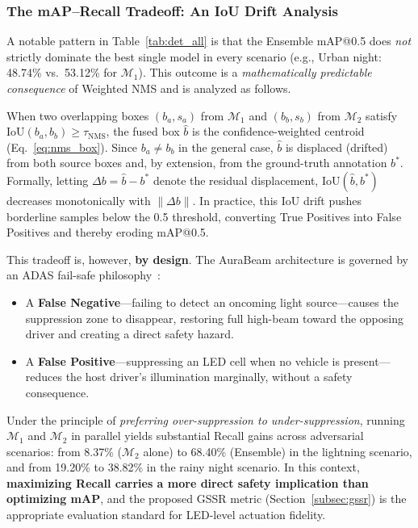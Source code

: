 \documentclass{jstarticle}
\theoremstyle{remark}
\begin{document}
\subsubsection*{The mAP--Recall Tradeoff: An IoU Drift Analysis}
\label{subsubsec:tradeoff}

A notable pattern in Table~\ref{tab:det_all} is that the Ensemble
mAP@0.5 does \emph{not} strictly dominate the best single model in
every scenario (e.g., Urban night: 48.74\% vs.\ 53.12\% for
$\mathcal{M}_1$). This outcome is a \emph{mathematically predictable
consequence} of Weighted NMS and is analyzed as follows.

When two overlapping boxes $(b_a, s_a)$ from $\mathcal{M}_1$ and
$(b_b, s_b)$ from $\mathcal{M}_2$ satisfy
$\mathrm{IoU}(b_a, b_b) \geq \tau_{\mathrm{NMS}}$, the fused box
$\hat{b}$ is the confidence-weighted centroid
(Eq.~\eqref{eq:nms_box}). Since $b_a \neq b_b$ in the general case,
$\hat{b}$ is displaced (drifted) from both source boxes and, by
extension, from the ground-truth annotation $b^*$. Formally, letting
$\Delta b = \hat{b} - b^*$ denote the residual displacement,
$\mathrm{IoU}(\hat{b}, b^*)$ decreases monotonically with
$\|\Delta b\|$. In practice, this IoU drift pushes borderline samples
below the 0.5 threshold, converting True Positives into False
Positives and thereby eroding mAP@0.5.

This tradeoff is, however, \textbf{by design}. The AuraBeam
architecture is governed by an ADAS fail-safe
philosophy~\cite{ISO26262_2018}:
\begin{itemize}[nosep]
  \item A \textbf{False Negative}---failing to detect an oncoming
    light source---causes the suppression zone to disappear, restoring
    full high-beam toward the opposing driver and creating a direct
    safety hazard.
  \item A \textbf{False Positive}---suppressing an LED cell when no
    vehicle is present---reduces the host driver's illumination
    marginally, without a safety consequence.
\end{itemize}
Under the principle of \emph{preferring over-suppression to
under-suppression}, running $\mathcal{M}_1$ and $\mathcal{M}_2$ in
parallel yields substantial Recall gains across adversarial scenarios:
from 8.37\% ($\mathcal{M}_2$ alone) to 68.40\% (Ensemble) in the
lightning scenario, and from 19.20\% to 38.82\% in the rainy night
scenario. In this context, \textbf{maximizing Recall carries a more
direct safety implication than optimizing mAP}, and the proposed GSSR
metric (Section~\ref{subsec:gssr}) is the appropriate evaluation
standard for LED-level actuation fidelity.
\end{document}
